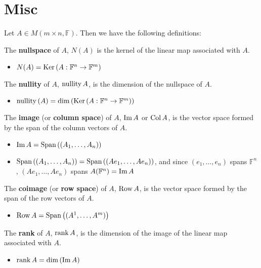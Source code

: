 \documentclass[letterpaper,12pt]{article}
\begin{document}
\section*{Misc}

Let $A \in M(m \times n, \mathbb{F})$. Then we have the following definitions:

\begin{definition}
The \textbf{nullspace} of $A$, $N(A)$ is the kernel of the linear map associated with $A$.
\begin{itemize}
    \item $N(A) = \operatorname{Ker}{(A: \mathbb{F}^n \rightarrow \mathbb{F}^m)}$
\end{itemize}
\end{definition}

\begin{definition}
The \textbf{nullity} of $A$, $\operatorname{nullity}{A}$, is the dimension of the nullspace of $A$.
\begin{itemize}
    \item $\operatorname{nullity}{(A)} = \dim{(\operatorname{Ker}{(A: \mathbb{F}^n \rightarrow \mathbb{F}^m)})}$
\end{itemize}
\end{definition}

\begin{definition}
The \textbf{image} (or \textbf{column space}) of $A$, $\operatorname{Im}{A}$ or $\operatorname{Col}{A}$, is the vector space formed by the span of the column vectors of $A$.
\begin{itemize}
    \item $\operatorname{Im}{A} = \text{Span}\left((A_1, \dots, A_n) \right)$
    \item $\text{Span}\left((A_1, \dots, A_n) \right) = \text{Span}\left((Ae_1, \dots, Ae_n) \right)$, and since $(e_1, \dots, e_n)$ spans $\mathbb{F}^n$, $(Ae_1, \dots, Ae_n)$ spans $A(\mathbb{F}^n) = \operatorname{Im}{A}$
\end{itemize}
\end{definition}

\begin{definition}
The \textbf{coimage} (or \textbf{row space}) of $A$, $\operatorname{Row}{A}$, is the vector space formed by the span of the row vectors of $A$.
\begin{itemize}
    \item $\operatorname{Row}{A} = \text{Span}\left((A^1, \dots, A^m) \right)$
\end{itemize}
\end{definition}

\begin{definition}
The \textbf{rank} of $A$, $\operatorname{rank}{A}$, is the dimension of the image of the linear map associated with $A$.
\begin{itemize}
    \item $\operatorname{rank}{A} = \dim{(\operatorname{Im}{A})}$
\end{itemize}
\end{definition}
\end{document}
